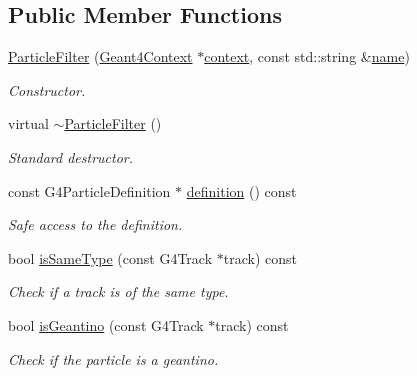 \subsection*{Public Member Functions}
\begin{DoxyCompactItemize}
\item 
\hyperlink{struct_d_d4hep_1_1_simulation_1_1_particle_filter_a52c16a1189b557c7c2140e370b747043}{Particle\+Filter} (\hyperlink{class_d_d4hep_1_1_simulation_1_1_geant4_context}{Geant4\+Context} $\ast$\hyperlink{class_d_d4hep_1_1_simulation_1_1_geant4_action_aa9d87f0ec2a72b7fc2591b18f98d75cf}{context}, const std\+::string \&\hyperlink{class_d_d4hep_1_1_simulation_1_1_geant4_action_af374e70b014d16afb81dd9d77cc3894b}{name})
\begin{DoxyCompactList}\small\item\em Constructor. \end{DoxyCompactList}\item 
virtual \hyperlink{struct_d_d4hep_1_1_simulation_1_1_particle_filter_a4f4ccdfa224f0a62c411230f7fb0cd65}{$\sim$\+Particle\+Filter} ()
\begin{DoxyCompactList}\small\item\em Standard destructor. \end{DoxyCompactList}\item 
const G4\+Particle\+Definition $\ast$ \hyperlink{struct_d_d4hep_1_1_simulation_1_1_particle_filter_a4f831e36facf6549347faafb0bb906f6}{definition} () const
\begin{DoxyCompactList}\small\item\em Safe access to the definition. \end{DoxyCompactList}\item 
bool \hyperlink{struct_d_d4hep_1_1_simulation_1_1_particle_filter_ac3ec79d2ac19acb431b1ea060b278f2c}{is\+Same\+Type} (const G4\+Track $\ast$track) const
\begin{DoxyCompactList}\small\item\em Check if a track is of the same type. \end{DoxyCompactList}\item 
bool \hyperlink{struct_d_d4hep_1_1_simulation_1_1_particle_filter_a5bf4dd25eb5f1000632fd5989f773676}{is\+Geantino} (const G4\+Track $\ast$track) const
\begin{DoxyCompactList}\small\item\em Check if the particle is a geantino. \end{DoxyCompactList}\end{DoxyCompactItemize}
